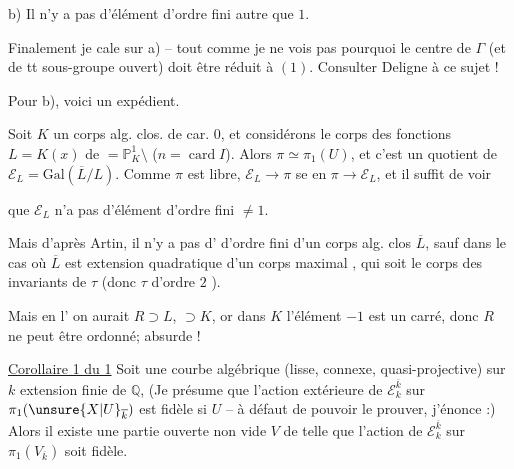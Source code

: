 b) Il n'y a pas  d'élément d'ordre fini autre que $1$.

Finalement je cale sur a) -- tout comme je ne vois pas pourquoi le centre de $\Gamma$
(et de tt sous-groupe ouvert) doit être réduit à $(1)$. Consulter Deligne à ce sujet !

Pour b), voici un expédient.

Soit $K$ un corps alg. clos. de car. $0$, et considérons le corps des fonctions
$L=K(x)$ de 
$=\mathbb P^1_K\setminus$
($n=\operatorname{card} I$). Alors $\pi\simeq\pi_1(U)$, et c'est un quotient de
$\mathcal E_L=\mathrm{Gal}(\overline L/L)$.
Comme $\pi$ est libre, $\mathcal E_L\longrightarrow\pi$ se  en
$\pi\longrightarrow\mathcal E_L$, et il suffit de voir


que $\mathcal E_L$ n'a pas d'élément d'ordre fini $\ne 1$.

Mais d'après Artin, il n'y a pas d' \inserted{\unsure{$\tau$}}
d'ordre fini  d'un corps alg. clos $\overline L$,
sauf dans le cas où $\overline L$ est extension quadratique d'un
 corps  maximal
,  qui soit le corps des invariants de
$\tau$ (donc $\tau$ d'ordre $2$ ).

 Mais en l' on aurait $R\supset L$,
$\supset K$, or dans $K$ l'élément $-1$ est un carré,
donc $R$ ne peut être ordonné; absurde !

\uline{Corollaire 1 du  1} Soit  une courbe algébrique
(lisse,  connexe, quasi-projective) sur $k$ extension finie de
$\mathbb Q$,  (Je présume que l'action extérieure de
$\mathcal E_k^{\overline k}$ sur $\pi_1(\unsure{X|U}_{\overline k})$ est fidèle
si $U$  -- à défaut de pouvoir le prouver, j'énonce :)
Alors il existe une partie ouverte non vide $V$ de  telle que
l'action  de $\mathcal E_k^{\overline k}$ sur
$\pi_1(V_{\overline k})$ soit fidèle.


